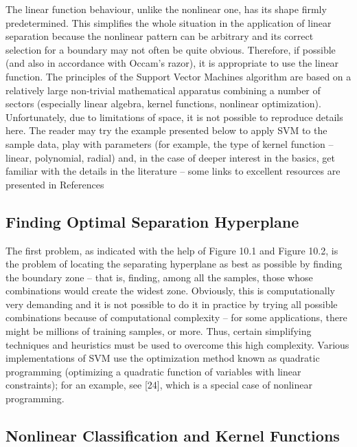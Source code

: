 \documentclass[11pt,openany,executivepaper]{book}
\begin{document}
The linear function behaviour, unlike the nonlinear one, has its shape firmly predetermined. This simplifies the whole situation in the application of linear separation because the nonlinear pattern can be arbitrary and its correct selection for
a boundary may not often be quite obvious. Therefore, if possible (and also in
accordance with Occam’s razor), it is appropriate to use the linear function.
The principles of the Support Vector Machines algorithm are based on a relatively large non-trivial mathematical apparatus combining a number of sectors
(especially linear algebra, kernel functions, nonlinear optimization). Unfortunately, due to limitations of space, it is not possible to reproduce details here.
The reader may try the example presented below to apply SVM to the sample
data, play with parameters (for example, the type of kernel function – linear,
polynomial, radial) and, in the case of deeper interest in the basics, get familiar
with the details in the literature – some links to excellent resources are presented
in References

\subsection{Finding Optimal Separation Hyperplane}
The first problem, as indicated with the help of Figure 10.1 and Figure 10.2, is
the problem of locating the separating hyperplane as best as possible by finding
the boundary zone – that is, finding, among all the samples, those whose combinations would create the widest zone. Obviously, this is computationally very
demanding and it is not possible to do it in practice by trying all possible combinations because of computational complexity – for some applications, there
might be millions of training samples, or more.
Thus, certain simplifying techniques and heuristics must be used to overcome this high complexity. Various implementations of SVM use the optimization method known as quadratic programming (optimizing a quadratic function
of variables with linear constraints); for an example, see [24], which is a special
case of nonlinear programming.

\subsection{Nonlinear Classification and Kernel Functions}
\end{document}
